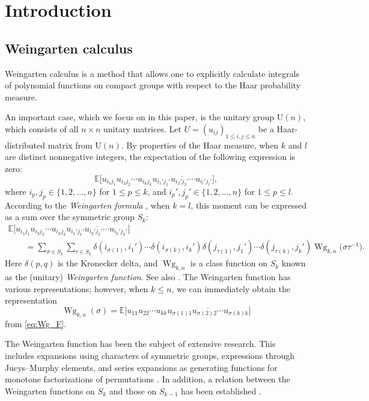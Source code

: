 \documentclass[pdftex]{sigma}
\numberwithin{equation}{section}
\theoremstyle{definition}
\newcommand{\UU}{\mathrm{U}}
\DeclareMathOperator{\Wg}{Wg}
\begin{document}

\section{Introduction}

\subsection{Weingarten calculus}

Weingarten calculus is a method that allows one to explicitly calculate integrals of polynomial functions on compact groups with respect to the Haar probability measure.

An important case, which we focus on in this paper, is the unitary group
$\UU(n)$, which consists of all $n \times n$ unitary matrices.
Let $U=(u_{ij})_{1 \le i,j \le n}$ be a Haar-distributed matrix from $\UU(n)$.
By properties of the Haar measure, when $k$ and $l$ are distinct nonnegative integers, the expectation of the following expression is zero:
\[
\mathbb{E} \bigl[ u_{i_1 j_1} u_{i_2 j_2} \cdots u_{i_k j_k}
\overline{u_{i_1' j_1'} u_{i_2' j_2'}\cdots u_{i_l' j_l'}} \bigr],
\]
where $i_p,j_p \in \{1,2,\dots,n\}$ for $1 \le p \le k$, and $i_p',j_p' \in \{1,2,\dots,n\}$ for $1 \le p \le l$.
According to the \emph{Weingarten formula} \cite{Collins2003, CollinsSniady2006},
when $k=l$, this moment can be expressed as a sum over the symmetric group $S_k$:
\begin{gather}
 \mathbb{E} \bigl[ u_{i_1 j_1} u_{i_2 j_2} \cdots u_{i_k j_k}
\overline{u_{i_1' j_1'} u_{i_2' j_2'}\cdots u_{i_k' j_k'}} \bigr] \nonumber\\
\qquad =\sum_{\sigma \in S_k}\sum_{\tau\in S_k}
\delta(i_{\sigma(1)}, i_1')\cdots \delta(i_{\sigma(k)}, i_k')
\delta(j_{\tau(1)}, j_1')\cdots \delta(j_{\tau(k)}, j_k')
\Wg_{k,n}\bigl(\sigma \tau^{-1}\bigr).\label{eq:Wg_F}
\end{gather}
Here $\delta(p,q)$ is the Kronecker delta, and $\Wg_{k,n}$ is a class function on $S_k$ known as the (unitary)
\emph{Weingarten function}.
See also \cite{MR597583}.
The Weingarten function has various representations; however, when $k \le n$, we can
immediately obtain the representation
 \[
 \Wg_{k,n}(\sigma) = \mathbb{E} \bigl[ u_{11} u_{22} \cdots u_{kk}
 \overline{u_{\sigma(1)1} u_{\sigma(2)2} \cdots u_{\sigma(k)k}} \bigr]
 \]
from \eqref{eq:Wg_F}.

The Weingarten function has been the subject of extensive research. This includes expansions using characters of symmetric groups, expressions through Jucys--Murphy elements, and series expansions as generating functions for monotone factorizations of permutations \cite{MatsumotoNovak, Novak2010}.
In addition, a relation between the Weingarten functions on $S_k$ and those on $S_{k-1}$ has been established \cite{CollinsMatsumoto2017}.
\end{document}
